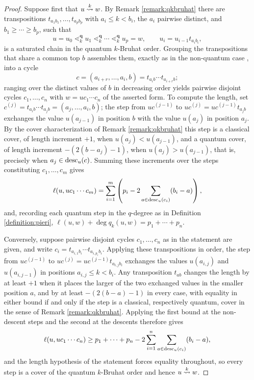 \documentclass{amsart}
\theoremstyle{definition}
\theoremstyle{remark}
\numberwithin{equation}{section}
\newcommand{\xrightsquigarrow}[2][]{%
	\mathrel{\mathop{\rightsquigarrow}\limits^{\scriptstyle #2}%
	\ifx\hfuzz#1\hfuzz\else_{\scriptstyle #1}\fi}%
}
\newcommand{\tom}[1]{\ensuremath{\xrightsquigarrow{#1}}}
\begin{document}
\begin{proof}
Suppose first that $u\tom{k}w$. By Remark \ref{remark:qkbruhat} there are transpositions $t_{a_1b_1},\ldots,t_{a_pb_p}$ with $a_i\leq k<b_i$, the $a_i$ pairwise distinct, and $b_1\geq\cdots\geq b_p$, such that
$$u=u_0\lessdot_k^{\mathbf q}u_1\lessdot_k^{\mathbf q}\cdots\lessdot_k^{\mathbf q}u_p=w,\qquad u_i=u_{i-1}t_{a_ib_i},$$
is a saturated chain in the quantum $k$-Bruhat order. Grouping the transpositions that share a common top $b$ assembles them, exactly as in the non-quantum case \cite[Lemma~7.3]{samuelmolev}, into a cycle
$$c=(a_{i+r},\ldots,a_i,b)=t_{a_ib}\cdots t_{a_{i+r}b};$$
ranging over the distinct values of $b$ in decreasing order yields pairwise disjoint cycles $c_1,\ldots,c_n$ with $w=uc_1\cdots c_n$ of the asserted form. To compute the length, set $c^{(j)}=t_{a_ib}\cdots t_{a_jb}=(a_j,\ldots,a_i,b)$; the step from $uc^{(j-1)}$ to $uc^{(j)}=uc^{(j-1)}t_{a_jb}$ exchanges the value $u(a_{j-1})$ in position $b$ with the value $u(a_j)$ in position $a_j$. By the cover characterization of Remark \ref{remark:qkbruhat} this step is a classical cover, of length increment $+1$, when $u(a_j)<u(a_{j-1})$, and a quantum cover, of length increment $-(2(b-a_j)-1)$, when $u(a_j)>u(a_{j-1})$, that is, precisely when $a_j\in\mathrm{desc}_u(c)$. Summing these increments over the steps constituting $c_1,\ldots,c_m$ gives
$$\ell(u,uc_1\cdots c_m)=\sum_{i=1}^m\left(p_i-2\sum_{a\in\mathrm{desc}_u(c_i)}(b_i-a)\right),$$
and, recording each quantum step in the $q$-degree as in Definition \ref{definition:pieri}, $\ell(u,w)+\deg q_k(u,w)=p_1+\cdots+p_n$.

Conversely, suppose pairwise disjoint cycles $c_1,\ldots,c_n$ as in the statement are given, and write $c_i=t_{a_{i,1}b_i}\cdots t_{a_{i,p_i}b_i}$. Applying these transpositions in order, the step from $uc^{(j-1)}$ to $uc^{(j)}=uc^{(j-1)}t_{a_{i,j}b_i}$ exchanges the values $u(a_{i,j})$ and $u(a_{i,j-1})$ in positions $a_{i,j}\leq k<b_i$. Any transposition $t_{ab}$ changes the length by at least $+1$ when it places the larger of the two exchanged values in the smaller position $a$, and by at least $-(2(b-a)-1)$ in every case, with equality in either bound if and only if the step is a classical, respectively quantum, cover in the sense of Remark \ref{remark:qkbruhat}. Applying the first bound at the non-descent steps and the second at the descents therefore gives
$$\ell(u,uc_1\cdots c_n)\geq p_1+\cdots+p_n-2\sum_{i=1}^n\sum_{a\in\mathrm{desc}_u(c_i)}(b_i-a),$$
and the length hypothesis of the statement forces equality throughout, so every step is a cover of the quantum $k$-Bruhat order and hence $u\tom{k}w$.
\end{proof}
\end{document}
